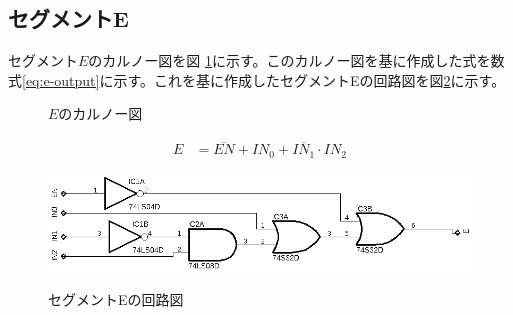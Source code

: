 \documentclass[a4paper,11pt,dvipdfmx]{jsarticle}
\begin{document}
\subsection{セグメントE}
セグメント$E$のカルノー図を図 \ref{fig:karnoE}に示す。このカルノー図を基に作成した式を数式\eqref{eq:e-output}に示す。これを基に作成したセグメントEの回路図を図\ref{fig:segE}に示す。
\begin{figure}[htbp]
  \centering
    \caption{\(E\)のカルノー図}
    \label{fig:karnoE}
\end{figure}
\begin{align}
  E &= \overline{EN} + IN_0 + \overline{IN_1} \cdotp IN_2\label{eq:e-output}
\end{align}
\begin{figure}[htbp]
  \centering
  \includegraphics{./images/E.png}
  \label{fig:segE}
  \caption{セグメントEの回路図}
\end{figure}
\newpage
\end{document}
